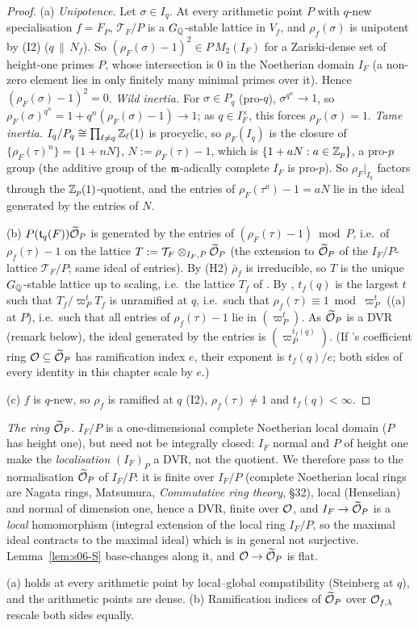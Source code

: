 \begin{proof}
(a) \emph{Unipotence.} Let $\sigma\in I_q$. At every arithmetic point $P$ with $q$-new specialisation $f=F_P$, $\mathcal T_F/P$ is a
$G_{\mathbb{Q}}$-stable lattice in $V_f$, and $\rho_f(\sigma)$ is unipotent by (I2) ($q\,\|\,N_f$). So $(\rho_F(\sigma)-1)^2\in P\,M_2(I_F)$ for a
Zariski-dense set of height-one primes $P$, whose intersection is $0$ in the Noetherian domain $I_F$ (a non-zero element lies in only
finitely many minimal primes over it). Hence $(\rho_F(\sigma)-1)^2=0$.
\emph{Wild inertia.} For $\sigma\in P_q$ (pro-$q$), $\sigma^{q^n}\to1$, so $\rho_F(\sigma)^{q^n}=1+q^n(\rho_F(\sigma)-1)\to1$; as $q\in I_F^\times$,
this forces $\rho_F(\sigma)=1$. \emph{Tame inertia.} $I_q/P_q\cong\prod_{\ell\ne q}\mathbb{Z}_\ell(1)$ is procyclic, so $\rho_F(I_q)$ is the closure of
$\{\rho_F(\tau)^n\}=\{1+nN\}$, $N:=\rho_F(\tau)-1$, which is $\{1+aN:a\in\mathbb{Z}_p\}$, a pro-$p$ group (the additive group of the
$\mathfrak{m}$-adically complete $I_F$ is pro-$p$). So $\rho_F|_{I_q}$ factors through the $\mathbb{Z}_p(1)$-quotient, and the entries of
$\rho_F(\tau^a)-1=aN$ lie in the ideal generated by the entries of $N$.

(b) $P(\mathfrak{t}_q(F))\widetilde{\mathcal{O}}_P$ is generated by the entries of $(\rho_F(\tau)-1)\bmod P$, i.e.\ of $\rho_f(\tau)-1$ on the lattice
$T:=\mathcal T_F\otimes_{I_F,P}\widetilde{\mathcal{O}}_P$ (the extension to $\widetilde{\mathcal{O}}_P$ of the $I_F/P$-lattice $\mathcal T_F/P$; same ideal of entries). By (H2) $\bar\rho_f$ is irreducible, so $T$ is the unique $G_{\mathbb{Q}}$-stable lattice up to scaling, i.e.\ the lattice
$T_f$ of \cite[\S2.2]{KO}. By \cite[Def.~2.12]{KO}, $t_f(q)$ is the largest $t$ such that $T_f/\varpi_P^tT_f$ is unramified at $q$, i.e.\ such that
$\rho_f(\tau)\equiv1\bmod\varpi_P^t$ ((a) at $P$), i.e.\ such that all entries of $\rho_f(\tau)-1$ lie in $(\varpi_P^t)$. As $\widetilde{\mathcal{O}}_P$ is a DVR (remark below),
the ideal generated by the entries is $(\varpi_P^{t_f(q)})$. (If \cite{KO}'s coefficient ring $\mathcal{O}\subseteq\widetilde{\mathcal{O}}_P$ has ramification index $e$,
their exponent is $t_f(q)/e$; both sides of every identity in this chapter scale by $e$.)

(c) $f$ is $q$-new, so $\rho_f$ is ramified at $q$ (I2), $\rho_f(\tau)\ne1$ and $t_f(q)<\infty$.
\end{proof}
\noindent \emph{The ring $\widetilde{\mathcal{O}}_P$.} $I_F/P$ is a one-dimensional complete Noetherian local domain ($P$ has height one), but need not be integrally closed: $I_F$ normal and $P$ of height one make the \emph{localisation} $(I_F)_P$ a DVR, not the quotient. We therefore pass to the normalisation $\widetilde{\mathcal{O}}_P$ of $I_F/P$: it is finite over $I_F/P$ (complete Noetherian local rings are Nagata rings, Matsumura, \emph{Commutative ring theory}, \S32), local (Henselian) and normal of dimension one, hence a DVR, finite over $\mathcal{O}$, and $I_F\to\widetilde{\mathcal{O}}_P$ is a \emph{local} homomorphism (integral extension of the local ring $I_F/P$, so the maximal ideal contracts to the maximal ideal) which is in general not surjective. Lemma~\ref{lem:s06-S} base-changes along it, and $\mathcal{O}\to\widetilde{\mathcal{O}}_P$ is flat. 

\noindent (a) holds at every arithmetic point by local--global compatibility (Steinberg at $q$), and the arithmetic points are dense.
(b) Ramification indices of $\widetilde{\mathcal{O}}_P$ over $\mathcal{O}_{f,\lambda}$ rescale both sides equally.
